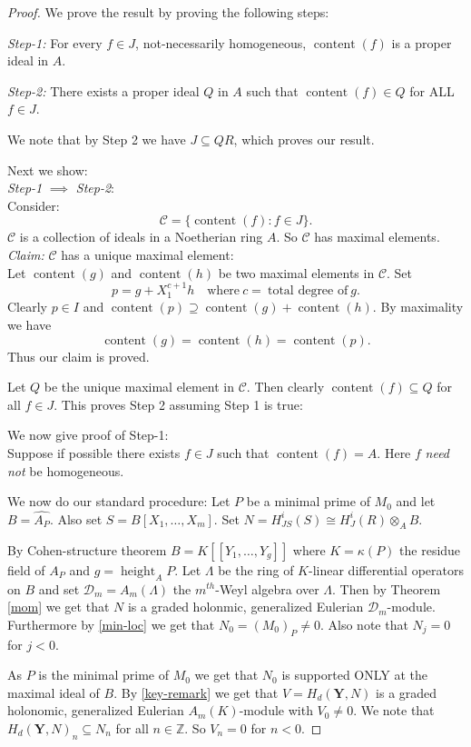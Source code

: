 \documentclass{amsart}
\newcommand{\ZZ}{\mathbb{Z} }
\newcommand{\D}{\mathcal{D} }
\newcommand{\bY}{\mathbf{Y} }
\newcommand{\content}{\operatorname{content}}
\newcommand{\height}{\operatorname{height}}
\theoremstyle{plain}
\theoremstyle{definition}
\theoremstyle{remark}
\begin{document}
\begin{proof}
We  prove the  result by proving the following steps:

\textit{Step-1:} For every $f \in J$, not-necessarily homogeneous, $\content(f)$ is a proper ideal in $A$.

\textit{Step-2:} There exists a proper ideal $Q$ in $A$ such that $\content(f) \in Q$ for ALL $f \in J$.

We note that by Step 2 we have $J \subseteq QR$, which proves our result. 

Next we show:\\
\textit{Step-1} $\implies$ \textit{Step-2}: \\
Consider:
\[
\mathcal{C} = \{ \content(f) \colon f \in J \}.
\] 
$\mathcal{C}$ is a collection of ideals in a Noetherian ring $A$. So $\mathcal{C}$ 
has maximal elements. \\
 \textit{Claim:} $\mathcal{C}$ has a unique maximal element:\\
 Let $\content(g)$ and $\content(h)$ be two maximal elements in $\mathcal{C}$. Set
 $$p = g  +  X_1^{c+1}h \quad \text{where} \ c = \ \text{total degree of} \ g.$$
 Clearly $p \in I$ and $\content(p) \supseteq \content(g) + \content(h)$. By maximality we have
 \[
 \content(g) = \content(h) = \content(p).
 \]
 Thus our claim is proved.
 
 Let $Q$ be the unique maximal element in $\mathcal{C}$. Then clearly $\content(f) \subseteq Q$ for all 
 $f \in J$. This proves Step 2  assuming Step 1 is true:
 
 We now give proof of Step-1:\\ Suppose if possible there exists $f \in J$ such that
 $\content(f) = A$.   Here $f$ \textit{need not} be homogeneous.
 
 We now do our standard procedure:
 Let $P$ be a minimal prime of $M_0$ and let $B = \widehat{A_P}$. Also 
 set $S = B[X_1,\ldots, X_m]$.
  Set $N = H^i_{JS}(S) \cong H^i_J(R)\otimes_A B$.
 
 By Cohen-structure theorem $B = K[[Y_1,\ldots, Y_g]]$ where $K = \kappa(P)$ the residue field of $A_P$  and $g = \height_A P$.
 Let $\Lambda $ be the ring of $K$-linear differential operators on $B$ and set $\D_m = A_m(\Lambda)$ the $m^{th}$-Weyl algebra
 over $\Lambda$. Then by  Theorem \ref{mom} we get that $N$ is a graded holonmic, generalized Eulerian
 $\D_m$-module.  Furthermore by \ref{min-loc} we get that 
 $N_{0} = (M_{0})_P \neq 0$.  Also note that $N_j = 0$ for $j < 0$.
 
 As $P$ is the minimal prime of $M_{0}$ we get that $N_0$ is supported  ONLY at the maximal ideal of $B$.
 By \ref{key-remark} we get that
 $V = H_d(\bY, N)$ is a graded holonomic, generalized Eulerian $A_m(K)$-module with $V_{0} \neq 0$. 
 We note that $H_d(\bY, N)_n \subseteq N_n$ for all $n \in \ZZ$. So $V_n = 0$ for $n < 0$.
 

\end{proof}
\end{document}
